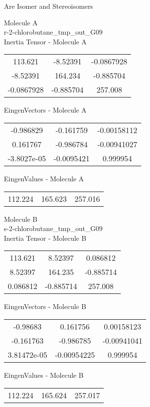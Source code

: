 \begin{center}
\vtab
\vtab
\textcolor{NavyBlue}{\Large Are Isomer and Stereoisomers}
\end{center}
\newpage
\begin{multicols}{2}
\begin{center}
Molecule A \\ 
r-2-chlorobutane\_tmp\_out\_G09
\\
Inertia Tensor - Molecule A \\
\vtab
\begin{tabular}{|c c c|}
113.621	 & 	-8.52391	 & 	-0.0867928	 \\
-8.52391	 & 	164.234	 & 	-0.885704	 \\
-0.0867928	 & 	-0.885704	 & 	257.008
\end{tabular}

\vtab
 EingenVectors - Molecule A     \\
\vtab
\begin{tabular}{|c c c|}
-0.986829	 & 	-0.161759	 & 	-0.00158112	 \\
0.161767	 & 	-0.986784	 & 	-0.00941027	 \\
-3.8027e-05	 & 	-0.0095421	 & 	0.999954
\end{tabular}

\vtab
 EingenValues - Molecule A     \\
\vtab
\begin{tabular}{|c c c|}
112.224	 & 	165.623	 & 	257.016
\end{tabular}
\columnbreak

Molecule B \\ 
s-2-chlorobutane\_tmp\_out\_G09
\\
Inertia Tensor - Molecule B \\
\vtab
\begin{tabular}{|c c c|}
113.621	 & 	8.52397	 & 	0.086812	 \\
8.52397	 & 	164.235	 & 	-0.885714	 \\
0.086812	 & 	-0.885714	 & 	257.008
\end{tabular}

\vtab
 EingenVectors - Molecule B     \\
\vtab
\begin{tabular}{|c c c|}
-0.98683	 & 	0.161756	 & 	0.00158123	 \\
-0.161763	 & 	-0.986785	 & 	-0.00941041	 \\
3.81472e-05	 & 	-0.00954225	 & 	0.999954
\end{tabular}

\vtab
 EingenValues - Molecule B     \\
\vtab
\begin{tabular}{|c c c|}
112.224	 & 	165.624	 & 	257.017
\end{tabular}

\end{center}
\end{multicols}
